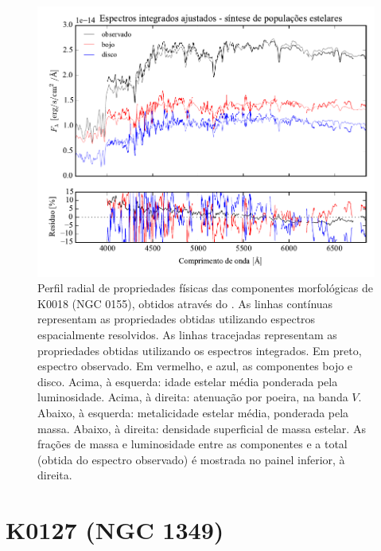 \begin{figure}
	\includegraphics[page=2]{figuras/sample006a_synthesis}
	\caption[Propriedades físicas das componentes morfológicas de K0018 (NGC 0155)]
	{Perfil radial de propriedades físicas das componentes morfológicas de
	K0018 (NGC 0155), obtidos através do \starlight. As linhas contínuas
	representam as propriedades obtidas utilizando espectros espacialmente
	resolvidos. As linhas tracejadas representam as propriedades obtidas utilizando
	os espectros integrados. Em preto, espectro observado. Em vermelho, e azul, as
	componentes bojo e disco. Acima, à esquerda: idade estelar média ponderada pela
	luminosidade. Acima, à direita: atenuação por poeira, na banda $V$. Abaixo, à
	esquerda: metalicidade estelar média, ponderada pela massa. Abaixo, à direita:
	densidade superficial de massa estelar. As frações de massa e luminosidade
	entre as componentes e a total (obtida do espectro observado) é mostrada no
	painel inferior, à direita.}
	\label{fig:decompSinteseRadprof:K0018}
\end{figure}


\section{K0127 (NGC 1349)}
\label{apendice:Decomp:K0127}


